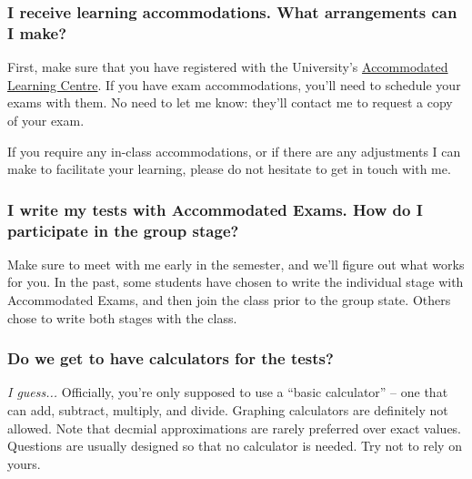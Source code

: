 \documentclass[10pt,]{article}
\begin{document}
\subsubsection[{I receive learning accommodations. What arrangements can I make?}]{I receive learning accommodations. What arrangements can I make?}\label{subsubsection-28}
\hypertarget{p-38}{}%
First, make sure that you have registered with the University's \href{https://www.uleth.ca/ross/accommodated-learning-centre}{Accommodated Learning Centre}. If you have exam accommodations, you'll need to schedule your exams with them. No need to let me know: they'll contact me to request a copy of your exam.%
\par
\hypertarget{p-39}{}%
If you require any in-class accommodations, or if there are any adjustments I can make to facilitate your learning, please do not hesitate to get in touch with me.%
%
%
\typeout{************************************************}
\typeout{************************************************}
%
\subsubsection[{I write my tests with Accommodated Exams. How do I participate in the group stage?}]{I write my tests with Accommodated Exams. How do I participate in the group stage?}\label{subsubsection-29}
\hypertarget{p-40}{}%
Make sure to meet with me early in the semester, and we'll figure out what works for you. In the past, some students have chosen to write the individual stage with Accommodated Exams, and then join the class prior to the group state. Others chose to write both stages with the class.%
%
%
\typeout{************************************************}
\typeout{************************************************}
%
\subsubsection[{Do we get to have calculators for the tests?}]{Do we get to have calculators for the tests?}\label{subsubsection-30}
\hypertarget{p-41}{}%
\emph{I guess...} Officially, you're only supposed to use a ``basic calculator'' -- one that can add, subtract, multiply, and divide. Graphing calculators are definitely not allowed. Note that decmial approximations are rarely preferred over exact values. Questions are usually designed so that no calculator is needed. Try not to rely on yours.%
%
%
\typeout{************************************************}
\typeout{************************************************}
%
\end{document}
